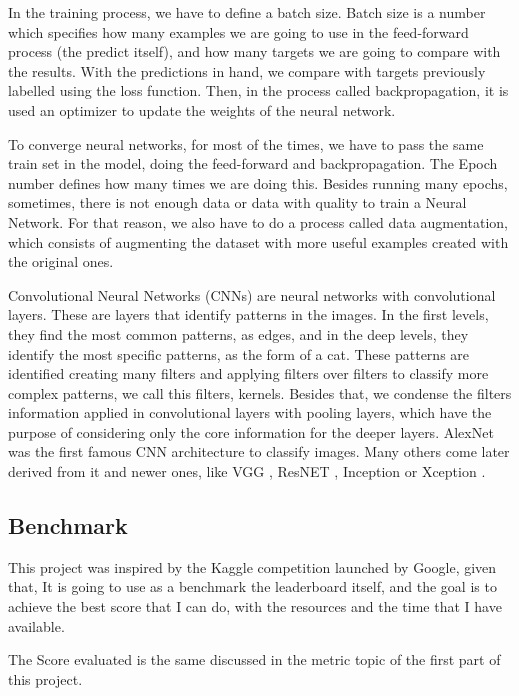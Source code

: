 \documentclass[11pt, a4paper, twocolumn]{article}
\begin{document}
In the training process, we have to define a batch size. Batch size is a number which specifies how many examples we are going to use in the feed-forward process (the predict itself), and how many targets we are going to compare with the results. With the predictions in hand, we compare with targets previously labelled using the loss function. Then, in the process called backpropagation, it is used an optimizer to update the weights of the neural network.

To converge neural networks, for most of the times, we have to pass the same train set in the model, doing the feed-forward and backpropagation. The Epoch number defines how many times we are doing this. Besides running many epochs, sometimes, there is not enough data or data with quality to train a Neural Network. For that reason, we also have to do a process called data augmentation, which consists of augmenting the dataset with more useful examples created with the original ones.

Convolutional Neural Networks (CNNs)\cite{cnns} are neural networks with convolutional layers. These are layers that identify patterns in the images. In the first levels, they find the most common patterns, as edges, and in the deep levels, they identify the most specific patterns, as the form of a cat. These patterns are identified creating many filters and applying filters over filters to classify more complex patterns, we call this filters, kernels. Besides that, we condense the filters information applied in convolutional layers with pooling layers, which have the purpose of considering only the core information for the deeper layers. \cite{cnn:1} AlexNet \cite{AlexNet} was the first famous CNN architecture to classify images. Many others come later derived from it and newer ones, like VGG \cite{vgg}, ResNET \cite{resnet}, Inception \cite{inception} or Xception \cite{xception}.

\subsection{Benchmark}

This project was inspired by the Kaggle competition launched by Google, given that, It is going to use as a benchmark the leaderboard itself, \cite{leaderboard} and the goal is to achieve the best score that I can do, with the resources and the time that I have available.

The Score evaluated is the same discussed in the metric topic of the first part of this project. 
\end{document}
